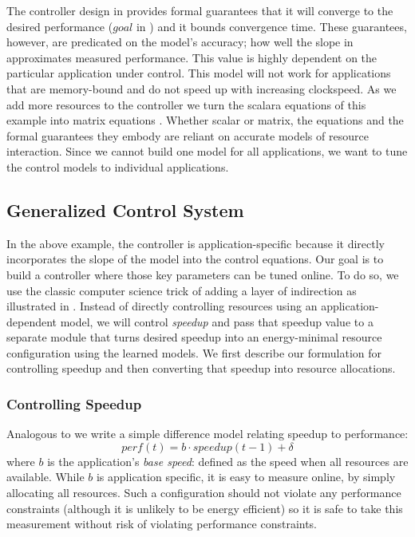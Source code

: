The controller design in  provides formal
guarantees that it will converge to the desired performance ($goal$ in
) and it bounds convergence time.  These
guarantees, however, are predicated on the model's accuracy; \ie how
well the slope in  approximates measured
performance.  This value is highly dependent on the particular
application under control.  This model will not work for applications
that are memory-bound and do not speed up with increasing clockspeed.
As we add more resources to the controller we turn the scalara
equations of this example into matrix equations
\cite{METE,josep-isca2016}.  Whether scalar or matrix, the equations
and the formal guarantees they embody are reliant on accurate models
of resource interaction.  Since we cannot build one model for all
applications, we want to tune the control models to individual
applications.

\subsection{Generalized Control System}
In the above example, the controller is application-specific because
it directly incorporates the slope of the model into the control
equations.  Our goal is to build a controller where those key
parameters can be tuned online.  To do so, we use the classic computer
science trick of adding a layer of indirection as illustrated in
.  Instead of directly controlling resources
using an application-dependent model, we will control \emph{speedup}
and pass that speedup value to a separate module that turns desired
speedup into an energy-minimal resource configuration using the
learned models.  We first describe our formulation for controlling
speedup and then converting that speedup into resource allocations.

\subsubsection{Controlling Speedup}
Analogous to  we write a simple difference model
relating speedup to performance:
\begin{equation}
  perf(t) = b \cdot speedup(t-1) + \delta \label{eqn:speedup}
\end{equation}
where $b$ is the application's \emph{base speed}: defined as the speed
when all resources are available.  While $b$ is application specific,
it is easy to measure online, by simply allocating all resources. Such
a configuration should not violate any performance constraints
(although it is unlikely to be energy efficient) so it is safe to take
this measurement without risk of violating performance constraints.

